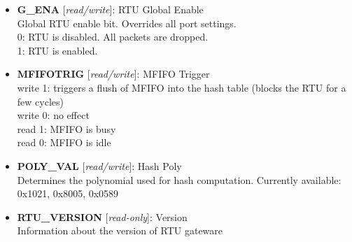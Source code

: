 \vspace{12pt}
\noindent
{}

\begin{itemize}
\item \begin{small}
{\bf 
G\_ENA
} [\emph{read/write}]: RTU Global Enable
\\
Global RTU enable bit. Overrides all port settings.\\                        0: RTU is disabled. All packets are dropped.\\                        1: RTU is enabled.
\end{small}
\item \begin{small}
{\bf 
MFIFOTRIG
} [\emph{read/write}]: MFIFO Trigger
\\
write 1: triggers a flush of MFIFO into the hash table (blocks the RTU for a few cycles)\\         write 0: no effect\\         read 1: MFIFO is busy\\         read 0: MFIFO is idle
\end{small}
\item \begin{small}
{\bf 
POLY\_VAL
} [\emph{read/write}]: Hash Poly
\\
Determines the polynomial used for hash computation. Currently available:  0x1021, 0x8005, 0x0589 
\end{small}
\item \begin{small}
{\bf 
RTU\_VERSION
} [\emph{read-only}]: Version
\\
Information about the version of RTU gateware
\end{small}
\end{itemize}
